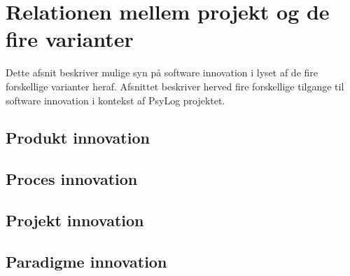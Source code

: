 \section{Relationen mellem projekt og de fire varianter}
Dette afsnit beskriver mulige syn på software innovation i lyset af de fire forskellige varianter heraf\citet[Afsnit 5.1, Side 30-31]{art:essence}.
Afsnittet beskriver herved fire forskellige tilgange til software innovation i kontekst af PsyLog projektet.

\subsection{Produkt innovation}

\subsection{Proces innovation}

\subsection{Projekt innovation}

\subsection{Paradigme innovation}
